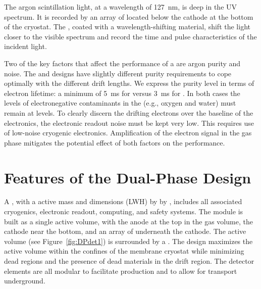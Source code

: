 The argon scintillation light, at a wavelength of  \SI{127}{nm}, is deep in the UV spectrum. It is recorded by an array of  located below the cathode at the bottom of the cryostat.  The , coated with a wavelength-shifting material, shift the light closer to the visible spectrum and record the time and pulse characteristics of the incident light.

Two of the key factors that affect the performance of a  are argon purity and noise.  The  and  designs have slightly different purity requirements to cope optimally with the different drift lengths. We express the purity level in terms of electron lifetime: a minimum of \SI{5}{ms} for  versus \SI{3}{ms} for . In both cases the levels of electronegative contaminants in the  (e.g., oxygen and water) must remain 
at  levels.  
To clearly discern the drifting electrons over the baseline of the electronics, the   electronic readout noise must be kept very low. This requires use of low-noise cryogenic electronics. 
Amplification of the electron signal in the gas phase mitigates the potential effect of both factors on the performance. %



\section{Features of the Dual-Phase Design}
\label{sec:dp-execsum-description}

A , with a  \dpactivelarmass{} active mass  and dimensions (LWH) \dptpclen by \dptpcwdth by \tpcheight{}, includes all associated cryogenics, electronic readout, computing, and safety systems. The module is built as a single active volume, with the anode at the top in the gas volume, the cathode near the bottom, and an array of  underneath the cathode. The active volume (see Figure~\ref{fig:DPdet1}) is surrounded by a . 
The  design maximizes the active volume within the confines of the membrane cryostat while minimizing dead regions and the presence of dead materials in the drift region.  The detector elements are all modular to facilitate production and to allow for transport underground.


